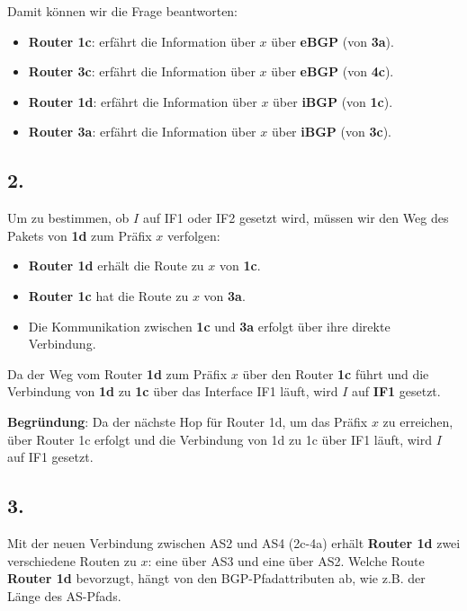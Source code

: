 \documentclass[a4paper]{scrartcl}
\begin{document}
Damit können wir die Frage beantworten:

\begin{itemize}
    \item \textbf{Router 1c}: erfährt die Information über \( x \) über \textbf{eBGP} (von \textbf{3a}).
    \item \textbf{Router 3c}: erfährt die Information über \( x \) über \textbf{eBGP} (von \textbf{4c}).
    \item \textbf{Router 1d}: erfährt die Information über \( x \) über \textbf{iBGP} (von \textbf{1c}).
    \item \textbf{Router 3a}: erfährt die Information über \( x \) über \textbf{iBGP} (von \textbf{3c}).
\end{itemize}
\subsection*{2.}
Um zu bestimmen, ob \( I \) auf IF1 oder IF2 gesetzt wird, müssen wir den Weg des Pakets von \textbf{1d} zum Präfix \( x \) verfolgen:

\begin{itemize}
    \item \textbf{Router 1d} erhält die Route zu \( x \) von \textbf{1c}.
    \item \textbf{Router 1c} hat die Route zu \( x \) von \textbf{3a}.
    \item Die Kommunikation zwischen \textbf{1c} und \textbf{3a} erfolgt über ihre direkte Verbindung.
\end{itemize}

Da der Weg vom Router \textbf{1d} zum Präfix \( x \) über den Router \textbf{1c} führt und die Verbindung von \textbf{1d} zu \textbf{1c} über das Interface IF1 läuft, wird \( I \) auf \textbf{IF1} gesetzt.

\textbf{Begründung}: Da der nächste Hop für Router 1d, um das Präfix \( x \) zu erreichen, über Router 1c erfolgt und die Verbindung von 1d zu 1c über IF1 läuft, wird \( I \) auf IF1 gesetzt.

\subsection*{3.}
Mit der neuen Verbindung zwischen AS2 und AS4 (2c-4a) erhält \textbf{Router 1d} zwei verschiedene Routen zu \( x \): eine über AS3 und eine über AS2. 
Welche Route \textbf{Router 1d} bevorzugt, hängt von den BGP-Pfadattributen ab, wie z.B. der Länge des AS-Pfads.
\end{document}

